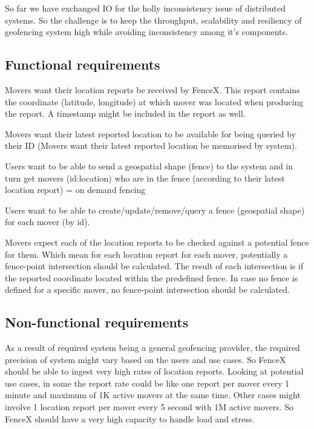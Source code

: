\documentclass[a4]{report}
\begin{document}
    So far we have exchanged IO for the holly inconsistency issue of distributed systems.
    So the challenge is to keep the throughput, scalability and resiliency of geofencing system high while avoiding
    inconsistency among it's components.

    \subsection{Functional requirements}
    Movers want their location reports be received by FenceX.
    This report contains the coordinate (latitude, longitude) at which mover was located when producing the report.
    A timestamp might be included in the report as well.

    Movers want their latest reported location to be available for being queried by their ID (Movers want their
    latest reported location be memorised by system).

    Users want to be able to send a geospatial shape (fence) to the system and in turn get movers (id:location) who
    are in the fence (according to their latest location report) = on demand fencing

    Users want to be able to create/update/remove/query a fence (geospatial shape) for each mover (by id).

    Movers expect each of the location reports to be checked against a potential fence for them.
    Which mean for each location report for each mover, potentially a fence-point intersection should be calculated.
    The result of each intersection is if the reported coordinate located within the predefined fence.
    In case no fence is defined for a specific mover, no fence-point intersection should be calculated.

    \subsection{Non-functional requirements}
    As a result of required system being a general geofencing provider,  the required precision of system might vary
    based on the users and use cases.
    So FenceX should be able to ingest very high rates of location reports.
    Looking at potential use cases, in some the report rate could be like one report per mover every 1 minute and
    maximum of 1K active movers at the same time.
    Other cases might involve 1 location report per mover every 5 second with 1M active movers.
    So FenceX should have a very high capacity to handle load and stress.
\end{document}
